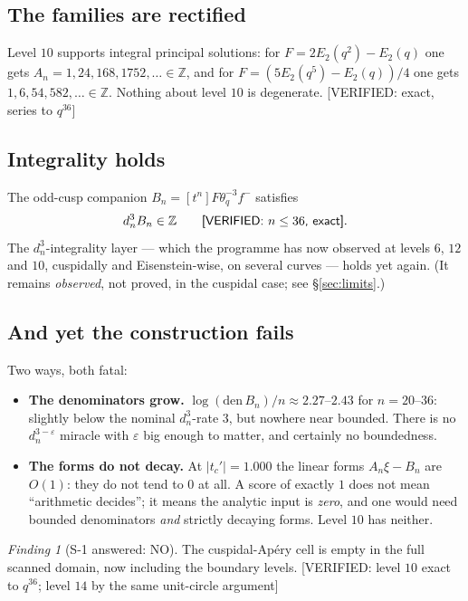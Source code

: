 \documentclass[11pt,reqno]{amsart}
\theoremstyle{plain}
\theoremstyle{definition}
\theoremstyle{remark}
\newtheorem{finding}[theorem]{Finding}
\newcommand{\Z}{\mathbb{Z}}
\newcommand{\eps}{\varepsilon}
\newcommand{\dn}{d_n}
\newcommand{\tcp}{t_c'}
\newcommand{\VerifiedR}[1]{\textup{\textsf{[VERIFIED: #1]}}}
\begin{document}
\subsection{The families are rectified}

Level $10$ supports integral principal solutions: for
$F=2E_2(q^2)-E_2(q)$ one gets $A_n = 1,24,168,1752,\dots\in\Z$, and for
$F=(5E_2(q^5)-E_2(q))/4$ one gets $1,6,54,582,\dots\in\Z$. Nothing about
level $10$ is degenerate. \VerifiedR{exact, series to $q^{36}$}

\subsection{Integrality holds}

The odd-cusp companion $B_n=[t^n]F\theta_q^{-3}f^-$ satisfies
\[
  \dn^3 B_n \in \Z \qquad \VerifiedR{$n\le36$, exact}.
\]
The $\dn^3$-integrality layer --- which the programme has now observed at
levels $6$, $12$ and $10$, cuspidally and Eisenstein-wise, on several
curves --- holds yet again. (It remains \emph{observed}, not proved, in
the cuspidal case; see \S\ref{sec:limits}.)

\subsection{And yet the construction fails}

Two ways, both fatal:

\begin{itemize}[leftmargin=1.4em]
\item \textbf{The denominators grow.} $\log(\mathrm{den}\,B_n)/n \approx
  2.27$--$2.43$ for $n=20$--$36$: slightly below the nominal $\dn^3$-rate
  $3$, but nowhere near bounded. There is no $\dn^{3-\eps}$ miracle with
  $\eps$ big enough to matter, and certainly no boundedness.
\item \textbf{The forms do not decay.} At $|\tcp|=1.000$ the linear forms
  $A_n\xi-B_n$ are $O(1)$: they do not tend to $0$ at all. A score of
  exactly $1$ does not mean ``arithmetic decides''; it means the analytic
  input is \emph{zero}, and one would need bounded denominators
  \emph{and} strictly decaying forms. Level $10$ has neither.
\end{itemize}

\begin{finding}[S-1 answered: NO]
\label{find:s1}
The cuspidal-Ap\'ery cell is empty in the full scanned domain, now
including the boundary levels. \VerifiedR{level $10$ exact to $q^{36}$;
level $14$ by the same unit-circle argument}
\end{finding}
\end{document}
